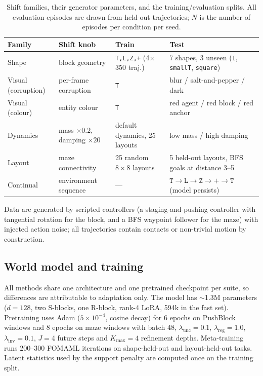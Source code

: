 \begin{table}[t]
\centering
\caption{Shift families, their generator parameters, and the training/evaluation splits. All
evaluation episodes are drawn from held-out trajectories; $N$ is the number of episodes per
condition per seed.}
\label{tab:suites}
\begin{tabular}{llll}
\toprule
Family & Shift knob & Train & Test \\
\midrule
Shape & block geometry & \texttt{T,L,Z,+} (4$\times$350 traj.) & 7 shapes, 3 unseen (\texttt{I}, \texttt{smallT}, \texttt{square})\\
Visual (corruption) & per-frame corruption & \texttt{T} & blur / salt-and-pepper / dark\\
Visual (colour) & entity colour & \texttt{T} & red agent / red block / red anchor\\
Dynamics & mass $\times0.2$, damping $\times20$ & default dynamics, 25 layouts & low mass / high damping\\
Layout & maze connectivity & 25 random $8{\times}8$ layouts & 5 held-out layouts, BFS goals at distance 3--5\\
Continual & environment sequence & --- & $\texttt{T}\!\to\!\texttt{L}\!\to\!\texttt{Z}\!\to\!\texttt{+}\!\to\!\texttt{T}$ (model persists)\\
\bottomrule
\end{tabular}
\end{table}

Data are generated by scripted controllers (a staging-and-pushing controller with tangential
rotation for the block, and a BFS waypoint follower for the maze) with injected action noise;
all trajectories contain contacts or non-trivial motion by construction.

\subsection{World model and training}

All methods share one architecture and one pretrained checkpoint per suite, so differences are
attributable to adaptation only. The model has $\sim$1.3M parameters ($d=128$, two S-blocks,
one R-block, rank-4 LoRA, 594k in the fast set). Pretraining uses Adam ($5\times10^{-4}$,
cosine decay) for 6 epochs on PushBlock windows and 8 epochs on maze windows with batch 48,
$\lambda_{\mathrm{unc}}=0.1$, $\lambda_{\mathrm{reg}}=1.0$, $\lambda_{\mathrm{inv}}=0.1$,
$J=4$ future steps and $K_{\max}=4$ refinement depths. Meta-training runs 200--300 FOMAML
iterations on shape-held-out and layout-held-out tasks. Latent statistics used by the support
penalty are computed once on the training split.

